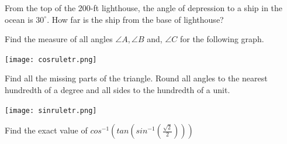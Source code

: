 \documentclass[11pt]{exam}
\begin{document}
\begin{questions}
\vspace{8cm}
\addpoints
\question[7] From the top of the 200-ft lighthouse, the angle of depression to a ship in the ocean is $30^\circ$. How far is the ship from the base of lighthouse?


\vspace{9cm}
\addpoints
\question[10] Find the measure of all angles $\angle A, \angle B$ and, $\angle C$ for the following graph.
\begin{center}
	\texttt{[image: cosruletr.png]}
\end{center}


\vspace{8cm}
\noaddpoints
\question[10] Find all the missing parts of the triangle. Round all angles to the nearest hundredth of a degree and all sides to the hundredth of a unit.
\begin{center}
	\texttt{[image: sinruletr.png]}
\end{center}
 
\vspace{8cm}
\noaddpoints
\question[10] 
\vspace{8cm}
\noaddpoints
\question[5 Bonus] Find the exact value of $cos^{-1}(tan(sin^{-1}(\frac{\sqrt{2}}{2})))$
\end{questions}
\end{document}
